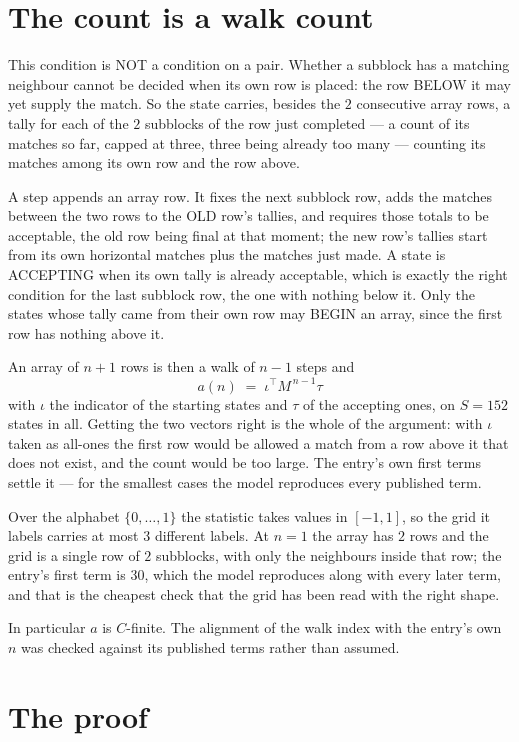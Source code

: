 \documentclass[11pt,a4paper]{article}
\theoremstyle{plain}
\theoremstyle{definition}
\begin{document}
\section{The count is a walk count}

This condition is NOT a condition on a pair. Whether a subblock has a
matching neighbour cannot be decided when its own row is placed: the row BELOW it may yet
supply the match. So the state carries, besides the $2$ consecutive array rows, a tally for
each of the $2$ subblocks of the row just completed --- a count of its matches so far, capped at three, three being already too many --- counting its matches
among its own row and the row above.

A step appends an array row. It fixes the next subblock row, adds the matches between the two
rows to the OLD row's tallies, and requires those totals to be acceptable, the old row being
final at that moment; the new row's tallies start from its own horizontal matches plus the
matches just made. A state is ACCEPTING when its own tally is already acceptable, which is
exactly the right condition for the last subblock row, the one with nothing below it. Only the
states whose tally came from their own row may BEGIN an array, since the first row has nothing
above it.

An array of $n+1$ rows is then a walk of $n-1$ steps and
\[
a(n)\;=\;\iota^{\!\top}M^{\,n-1}\tau
\]
with $\iota$ the indicator of the starting states and $\tau$ of the accepting ones, on
$S=152$ states in all. Getting the two vectors right is the whole of the argument: with
$\iota$ taken as all-ones the first row would be allowed a match from a row above it that does
not exist, and the count would be too large. The entry's own first terms settle it --- for
the smallest cases
the model reproduces every published term.

Over the alphabet $\{0,\dots,1\}$ the statistic takes values in $[-1,1]$, so the
grid it labels carries at most $3$ different labels. At $n=1$ the array has $2$
rows and the grid is a single row of $2$
subblocks, with only the neighbours inside that row; the entry's first term is
$30$, which the model reproduces along with every later term, and that is the cheapest
check that the grid has been read with the right shape.

In particular $a$ is $C$-finite. The alignment of the walk index with the entry's own $n$ was
checked against its published terms rather than assumed.

\section{The proof}
\end{document}
